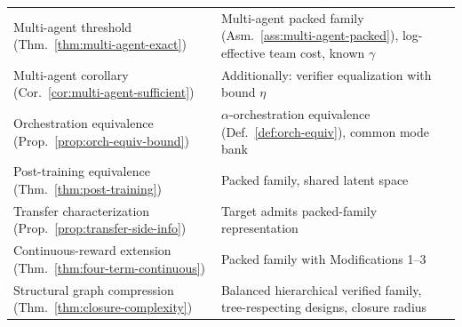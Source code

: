 \documentclass[10pt]{article}
\theoremstyle{paperplain}
\theoremstyle{paperdefinition}
\theoremstyle{paperremark}
\begin{document}
\begin{center}
\begin{tabular}{@{}lp{7cm}@{}}
Multi-agent threshold (Thm.~\ref{thm:multi-agent-exact}) & Multi-agent packed family (Asm.~\ref{ass:multi-agent-packed}), log-effective team cost, known $\gamma$ \\
Multi-agent corollary (Cor.~\ref{cor:multi-agent-sufficient}) & Additionally: verifier equalization with bound $\eta$ \\
Orchestration equivalence (Prop.~\ref{prop:orch-equiv-bound}) & $\alpha$-orchestration equivalence (Def.~\ref{def:orch-equiv}), common mode bank \\
Post-training equivalence (Thm.~\ref{thm:post-training}) & Packed family, shared latent space \\
Transfer characterization (Prop.~\ref{prop:transfer-side-info}) & Target admits packed-family representation \\
Continuous-reward extension (Thm.~\ref{thm:four-term-continuous}) & Packed family with Modifications 1--3 \\
Structural graph compression (Thm.~\ref{thm:closure-complexity}) & Balanced hierarchical verified family, tree-respecting designs, closure radius \\
\bottomrule
\end{tabular}
\end{center}
\end{document}
